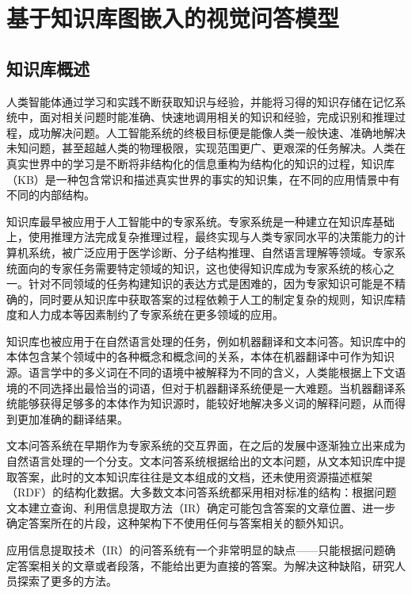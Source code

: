\chapter{基于知识库图嵌入的视觉问答模型}
\section{知识库概述}
人类智能体通过学习和实践不断获取知识与经验，并能将习得的知识存储在记忆系统中，面对相关问题时能准确、快速地调用相关的知识和经验，完成识别和推理过程，成功解决问题。人工智能系统的终极目标便是能像人类一般快速、准确地解决未知问题，甚至超越人类的物理极限，实现范围更广、更艰深的任务解决。人类在真实世界中的学习是不断将非结构化的信息重构为结构化的知识的过程，知识库（KB）是一种包含常识和描述真实世界的事实的知识集，在不同的应用情景中有不同的内部结构。

知识库最早被应用于人工智能中的专家系统。专家系统是一种建立在知识库基础上，使用推理方法完成复杂推理过程，最终实现与人类专家同水平的决策能力的计算机系统，被广泛应用于医学诊断、分子结构推理、自然语言理解等领域。专家系统面向的专家任务需要特定领域的知识，这也使得知识库成为专家系统的核心之一。针对不同领域的任务构建知识的表达方式是困难的，因为专家知识可能是不精确的，同时要从知识库中获取答案的过程依赖于人工的制定复杂的规则，知识库精度和人力成本等因素制约了专家系统在更多领域的应用。

知识库也被应用于在自然语言处理的任务，例如机器翻译和文本问答。知识库中的本体包含某个领域中的各种概念和概念间的关系，本体在机器翻译中可作为知识源。语言学中的多义词在不同的语境中被解释为不同的含义，人类能根据上下文语境的不同选择出最恰当的词语，但对于机器翻译系统便是一大难题。当机器翻译系统能够获得足够多的本体作为知识源时，能较好地解决多义词的解释问题，从而得到更加准确的翻译结果。

文本问答系统在早期作为专家系统的交互界面，在之后的发展中逐渐独立出来成为自然语言处理的一个分支。文本问答系统根据给出的文本问题，从文本知识库中提取答案，此时的文本知识库往往是文本组成的文档，还未使用资源描述框架（RDF）的结构化数据。大多数文本问答系统都采用相对标准的结构：根据问题文本建立查询、利用信息提取方法（IR）确定可能包含答案的文章位置、进一步确定答案所在的片段，这种架构下不使用任何与答案相关的额外知识。

应用信息提取技术（IR）的问答系统有一个非常明显的缺点——只能根据问题确定答案相关的文章或者段落，不能给出更为直接的答案。为解决这种缺陷，研究人员探索了更多的方法。

